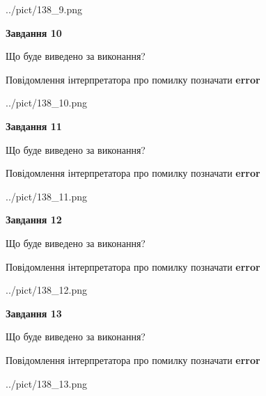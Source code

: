 \documentclass[11pt, ukrainian]{article}
\begin{document}
{\begin {large}
\begin{center}
	{../pict/138_9.png}
\end{center}
\newpage

{\begin {center}\textbf{Завдання 10}\end {center}}\par
Що буде виведено за виконання? \par
Повідомлення інтерпретатора про помилку позначати \textbf{error}

\begin{center}
	{../pict/138_10.png}
\end{center}
\newpage

{\begin {center}\textbf{Завдання 11}\end {center}}\par
Що буде виведено за виконання? \par
Повідомлення інтерпретатора про помилку позначати \textbf{error}

\begin{center}
	{../pict/138_11.png}
\end{center}
\newpage

{\begin {center}\textbf{Завдання 12}\end {center}}\par
Що буде виведено за виконання? \par
Повідомлення інтерпретатора про помилку позначати \textbf{error}

\begin{center}
	{../pict/138_12.png}
\end{center}
\newpage

{\begin {center}\textbf{Завдання 13}\end {center}}\par
Що буде виведено за виконання? \par
Повідомлення інтерпретатора про помилку позначати \textbf{error}

\begin{center}
	{../pict/138_13.png}
\end{center}
\newpage


\end{large}}
\end{document}
